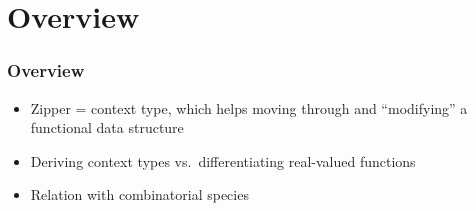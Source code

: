 \section{Overview}

\begin{frame}
\frametitle{Overview}

\begin{itemize}
\item Zipper = context type, which helps moving through and ``modifying'' a functional data structure
\item Deriving context types vs.\ differentiating real-valued functions
\item Relation with combinatorial species
\end{itemize}
\end{frame}